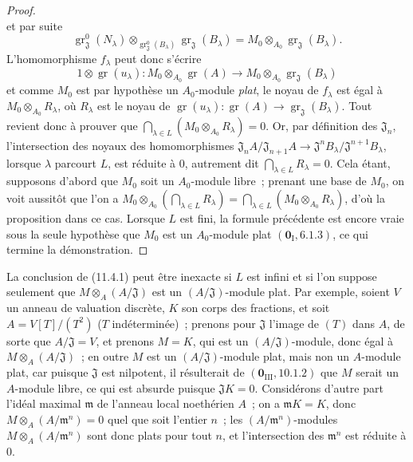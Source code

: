 \begin{proof}
\[\]
et par suite
\[
\operatorname{gr}_{\mathfrak J}^0(N_\lambda)
\otimes_{\operatorname{gr}_{\mathfrak J}^0(B_\lambda)}
\operatorname{gr}_{\mathfrak J}(B_\lambda)
=M_0\otimes_{A_0}\operatorname{gr}_{\mathfrak J}(B_\lambda).
\]
L'homomorphisme $f_\lambda$ peut donc s'écrire
\[
1\otimes\operatorname{gr}(u_\lambda):
M_0\otimes_{A_0}\operatorname{gr}(A)
\longrightarrow M_0\otimes_{A_0}\operatorname{gr}_{\mathfrak J}(B_\lambda)
\]
et comme $M_0$ est par hypothèse un $A_0$-module \emph{plat}, le noyau de
$f_\lambda$ est égal à $M_0\otimes_{A_0}R_\lambda$, où $R_\lambda$ est le
noyau de
$\operatorname{gr}(u_\lambda):\operatorname{gr}(A)
\to\operatorname{gr}_{\mathfrak J}(B_\lambda)$. Tout revient donc à prouver
que
$\bigcap_{\lambda\in L}(M_0\otimes_{A_0}R_\lambda)=0$.
Or, par définition des $\mathfrak J_n$, l'intersection des noyaux des
homomorphismes
$\mathfrak J_nA/\mathfrak J_{n+1}A
\longrightarrow\mathfrak J^nB_\lambda/\mathfrak J^{n+1}B_\lambda$,
lorsque $\lambda$ parcourt $L$, est réduite à $0$, autrement dit
$\bigcap_{\lambda\in L}R_\lambda=0$. Cela étant, supposons d'abord que $M_0$
soit un $A_0$-module libre~; prenant une base de $M_0$, on voit aussitôt que
l'on a
$M_0\otimes_{A_0}(\bigcap_{\lambda\in L}R_\lambda)
=\bigcap_{\lambda\in L}(M_0\otimes_{A_0}R_\lambda)$,
d'où la proposition dans ce cas. Lorsque $L$ est fini, la formule précédente
est encore vraie sous la seule hypothèse que $M_0$ est un $A_0$-module plat
$(\mathbf 0_{\mathrm I},6.1.3)$, ce qui termine la démonstration.
\end{proof}

\begin{remark}[11.4.2]
\label{IV.11.4.2-fr}
La conclusion de (11.4.1) peut être inexacte si $L$ est infini et si l'on
suppose seulement que $M\otimes_A(A/\mathfrak J)$ est un
$(A/\mathfrak J)$-module plat. Par exemple, soient $V$ un anneau de valuation
discrète, $K$ son corps des fractions, et soit $A=V[T]/(T^2)$ ($T$
indéterminée)~; prenons pour $\mathfrak J$ l'image de $(T)$ dans $A$, de sorte
que $A/\mathfrak J=V$, et prenons $M=K$, qui est un
$(A/\mathfrak J)$-module, donc égal à $M\otimes_A(A/\mathfrak J)$~; en outre
$M$ est un $(A/\mathfrak J)$-module plat, mais non un $A$-module plat, car
puisque $\mathfrak J$ est nilpotent, il résulterait de
$(\mathbf 0_{\mathrm{III}},10.1.2)$ que $M$ serait un $A$-module libre, ce qui
est absurde puisque $\mathfrak JK=0$. Considérons d'autre part l'idéal maximal
$\mathfrak m$ de l'anneau local noethérien $A$~; on a $\mathfrak mK=K$, donc
$M\otimes_A(A/\mathfrak m^n)=0$ quel que soit l'entier $n$~; les
$(A/\mathfrak m^n)$-modules $M\otimes_A(A/\mathfrak m^n)$ sont donc plats pour
tout $n$, et l'intersection des $\mathfrak m^n$ est réduite à $0$.
\end{remark}

